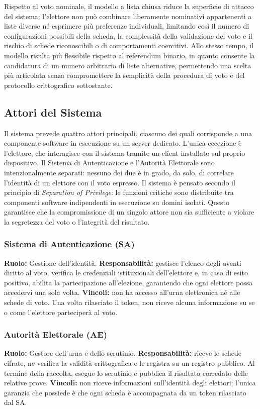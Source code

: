 \documentclass[12pt,a4paper]{article}
\begin{document}
Rispetto al voto nominale, il modello a lista chiusa riduce la superficie di attacco del
sistema: l'elettore non può combinare liberamente nominativi appartenenti a liste diverse né
esprimere più preferenze individuali, limitando così il numero di configurazioni possibili
della scheda, la complessità della validazione del voto e il rischio di schede riconoscibili o
di comportamenti coercitivi. Allo stesso tempo, il modello risulta più flessibile rispetto al
referendum binario, in quanto consente la candidatura di un numero arbitrario di liste
alternative, permettendo una scelta più articolata senza compromettere la semplicità della
procedura di voto e del protocollo crittografico sottostante.

\subsection{Attori del Sistema}

Il sistema prevede quattro attori principali, ciascuno dei quali corrisponde a una componente
software in esecuzione su un server dedicato. L'unica eccezione è l'elettore, che interagisce
con il sistema tramite un client installato sul proprio dispositivo. Il Sistema di
Autenticazione e l'Autorità Elettorale sono intenzionalmente separati: nessuno dei due è in
grado, da solo, di correlare l'identità di un elettore con il voto espresso. Il sistema è
pensato secondo il principio di \textit{Separation of Privilege}: le funzioni critiche sono
distribuite tra componenti software indipendenti in esecuzione su domini isolati. Questo
garantisce che la compromissione di un singolo attore non sia sufficiente a violare la
segretezza del voto o l'integrità del risultato.

\subsubsection{Sistema di Autenticazione (SA)}
\textbf{Ruolo:} Gestione dell'identità.
\textbf{Responsabilità:} gestisce l'elenco degli aventi diritto al voto, verifica le credenziali
istituzionali dell'elettore e, in caso di esito positivo, abilita la partecipazione all'elezione,
garantendo che ogni elettore possa accedervi una sola volta.
\textbf{Vincoli:} non ha accesso all'urna elettronica né alle schede di voto. Una volta rilasciato
il token, non riceve alcuna informazione su se o come l'elettore parteciperà al voto.

\subsubsection{Autorità Elettorale (AE)}
\textbf{Ruolo:} Gestore dell'urna e dello scrutinio.
\textbf{Responsabilità:} riceve le schede cifrate, ne verifica la validità crittografica e le
registra su un registro pubblico. Al termine della raccolta, esegue lo scrutinio e pubblica il
risultato corredato delle relative prove.
\textbf{Vincoli:} non riceve informazioni sull'identità degli elettori; l'unica garanzia che
possiede è che ogni scheda è accompagnata da un token rilasciato dal SA.
\end{document}
